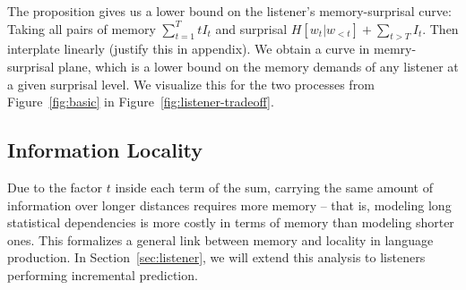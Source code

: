 






The proposition gives us a lower bound on the listener's memory-surprisal curve: Taking all pairs of memory $\sum_{t=1}^T t I_t$ and surprisal $H[w_t|w_{<t}] + \sum_{t > T} I_t$.
Then interplate linearly (justify this in appendix).
We obtain a curve in memry-surprisal plane, which is a lower bound on the memory demands of any listener at a given surprisal level.
We visualize this for the two processes from Figure~\ref{fig:basic} in Figure~\ref{fig:listener-tradeoff}.














\subsection{Information Locality}\label{sec:info-locality}

Due to the factor $t$ inside each term of the sum, carrying the same amount of information over longer distances requires more memory -- that is, modeling long statistical dependencies is more costly in terms of memory than modeling shorter ones.
This formalizes a general link between memory and locality in language production.
In Section~\ref{sec:listener}, we will extend this analysis to listeners performing incremental prediction.

